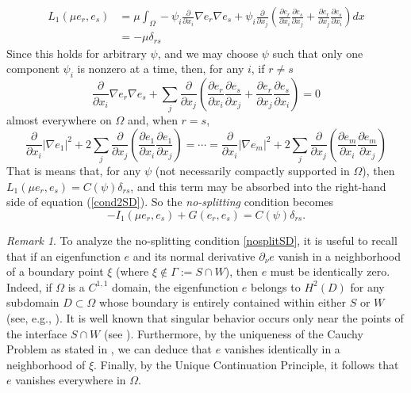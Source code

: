 \documentclass[a4paper,reqno,11pt,oneside]{amsart}
\theoremstyle{plain}
\theoremstyle{plain}
\theoremstyle{plain}
\theoremstyle{remark}
\newtheorem{remark}[thm]{Remark}
\begin{document}
$$\begin{aligned}
    L_1( \mu e_r,e_s)&=
  \mu \int_\Omega-\psi_i \frac{\partial}{\partial x_i} \nabla e_r\nabla e_s + \psi_i\frac{\partial }{ \partial x_j}\left(\frac{\partial e_r}{\partial x_i}\frac{\partial e_s}{\partial x_j}+
\frac{\partial e_r}{\partial x_j}\frac{\partial e_s}{\partial x_i}
\right) dx
\\ &=-\mu \delta_{rs}
\end{aligned}$$
Since this holds for arbitrary $\psi$, and  we may choose $\psi$ such that only one component $\psi_i$  is nonzero  at a time, then, for any $i$,  if $r\neq s$
\begin{equation*}
    \frac{\partial}{\partial x_i} \nabla e_r\nabla e_s +\sum_j\frac{\partial }{ \partial x_j}\left(\frac{\partial e_r}{\partial x_i}\frac{\partial e_s}{\partial x_j}+
\frac{\partial e_r}{\partial x_j}\frac{\partial e_s}{\partial x_i}
\right)=0
\end{equation*}
 almost everywhere on $\Omega$ and, when $r=s$, 
 \begin{equation*}
     \frac{\partial}{\partial x_i} |\nabla e_1|^2 +2\sum_j\frac{\partial }{ \partial x_j}\left(\frac{\partial e_1}{\partial x_i}\frac{\partial e_1}{\partial x_j}
\right)=\cdots=
\frac{\partial}{\partial x_i} |\nabla e_m|^2 +2\sum_j\frac{\partial }{ \partial x_j}\left(\frac{\partial e_m}{\partial x_i}\frac{\partial e_m}{\partial x_j}
\right)
 \end{equation*}
 That is means that, for any $\psi$ (not necessarily compactly supported in $\Omega$),  then $L_1(\mu e_r,e_s)=C(\psi)\delta_{rs}$, and   this term may be absorbed into the right-hand side of equation (\ref{cond2SD}). So the {\em no-splitting} condition becomes
 \begin{equation}\label{nosplitSD}
    -I_1(\mu e_r,e_s)
+G( e_r,e_s)=C(\psi)\delta_{rs}.
\end{equation}


\begin{remark}
To analyze the no-splitting condition \eqref{nosplitSD}, it is useful to recall that if an eigenfunction $e$ and its normal derivative $\partial_\nu e$ vanish in a neighborhood of a boundary point $\xi$ (where $\xi \notin \Gamma := S \cap W$), then $e$ must be identically zero.
Indeed, if $\Omega$ is a $C^{1,1}$ domain, the eigenfunction $e$ belongs to $H^2(D)$ for any subdomain $D \subset \Omega$ whose boundary is entirely contained within either $S$ or $W$ (see, e.g., \cite[Theorem 2.4.2.7]{grisvard}). It is well known that singular behavior occurs only near the points of the interface $S \cap W$ (see \cite{savare}). Furthermore, by the uniqueness of the Cauchy Problem as stated in \cite[p. 83]{henry}, we can deduce that $e$ vanishes identically in a neighborhood of $\xi$. Finally, by the Unique Continuation Principle, it follows that $e$ vanishes everywhere in $\Omega$.
\end{remark}
\end{document}
